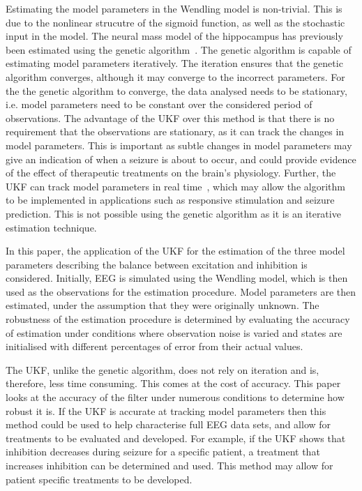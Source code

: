 Estimating the model parameters in the Wendling model is non-trivial. This is due to the nonlinear strucutre of the sigmoid function, as well as the stochastic input in the model. The neural mass model of the hippocampus has previously been estimated using the genetic algorithm~\citep{wendling2005interictal}. The genetic algorithm is capable of estimating model parameters iteratively. The iteration ensures that the genetic algorithm converges, although it may converge to the incorrect parameters. For the the genetic algorithm to converge, the data analysed needs to be stationary, i.e. model parameters need to be constant over the considered period of observations. The advantage of the UKF over this method is that there is no requirement that the observations are stationary, as it can track the changes in model parameters. This is important as subtle changes in model parameters may give an indication of when a seizure is about to occur, and could provide evidence of the effect of therapeutic treatments on the brain's physiology. Further, the UKF can track model parameters in real time~\iref, which may allow the algorithm to be implemented in applications such as responsive stimulation and seizure prediction. This is not possible using the genetic algorithm as it is an iterative estimation technique.


In this paper, the application of the UKF for the estimation of the three model parameters describing the balance between excitation and inhibition is considered. Initially, EEG is simulated using the Wendling model, which is then used as the observations for the estimation procedure. Model parameters are then estimated, under the assumption that they were originally unknown. The robustness of the estimation procedure is determined by evaluating the accuracy of estimation under conditions where observation noise is varied and states are initialised with different percentages of error from their actual values.

The UKF, unlike the genetic algorithm, does not rely on iteration and is, therefore, less time consuming. This comes at the cost of accuracy. This paper looks at the accuracy of the filter under numerous conditions to determine how robust it is. If the UKF is accurate at tracking model parameters then this method could be used to help characterise full EEG data sets, and allow for treatments to be evaluated and developed. For example, if the UKF shows that inhibition decreases during seizure for a specific patient, a treatment that increases inhibition can be determined and used. This method may allow for patient specific treatments to be developed.

